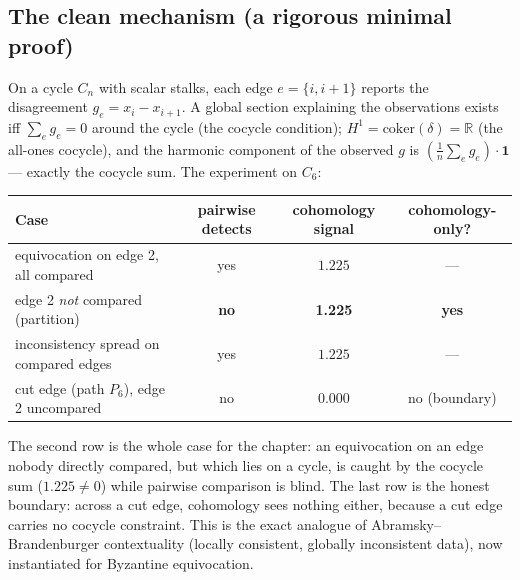 \documentclass[11pt,a4paper]{article}
\begin{document}
\subsection{The clean mechanism (a rigorous minimal proof)}
On a cycle $C_n$ with scalar stalks, each edge $e=\{i,i{+}1\}$ reports the disagreement $g_e=x_i-x_{i+1}$. A global section explaining the observations exists iff $\sum_e g_e=0$ around the cycle (the cocycle condition); $H^1=\mathrm{coker}(\delta)=\mathbb{R}$ (the all-ones cocycle), and the harmonic component of the observed $g$ is $(\tfrac1n\sum_e g_e)\cdot\mathbf 1$ --- exactly the cocycle sum. The experiment on $C_6$:
\begin{center}
\begin{tabular}{@{}lccc@{}}
\toprule
Case & pairwise detects & cohomology signal & cohomology-only? \\
\midrule
equivocation on edge 2, all compared & yes & $1.225$ & --- \\
edge 2 \emph{not} compared (partition) & \textbf{no} & \textbf{1.225} & \textbf{yes} \\
inconsistency spread on compared edges & yes & $1.225$ & --- \\
cut edge (path $P_6$), edge 2 uncompared & no & $0.000$ & no (boundary) \\
\bottomrule
\end{tabular}
\end{center}
The second row is the whole case for the chapter: an equivocation on an edge nobody directly compared, but which lies on a cycle, is caught by the cocycle sum ($1.225\neq0$) while pairwise comparison is blind. The last row is the honest boundary: across a cut edge, cohomology sees nothing either, because a cut edge carries no cocycle constraint. This is the exact analogue of Abramsky--Brandenburger contextuality (locally consistent, globally inconsistent data), now instantiated for Byzantine equivocation.
\end{document}

